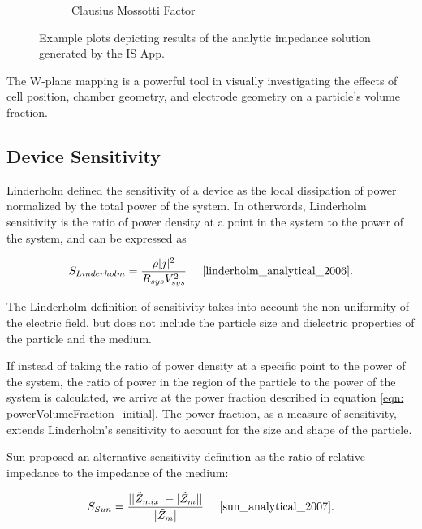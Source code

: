 \begin{figure}[h]
\begin{subfigure}[b]{0.49\textwidth}
        \caption{Clausius Mossotti Factor}
    \end{subfigure}
    \caption{Example plots depicting results of the analytic impedance solution generated by the IS App.}
    \label{fig:novel_volume_fractions_illustrations}
\end{figure}

\par The W-plane mapping is a powerful tool in visually investigating the effects of cell position, chamber geometry, and electrode geometry on a particle's volume fraction. 

\subsection{Device Sensitivity}
\par Linderholm defined the sensitivity of a device as the local dissipation of power normalized by the total power of the system. In otherwords, Linderholm sensitivity is the ratio of power density at a point in the system to the power of the system, and can be expressed as

\begin{equation}
    S_{Linderholm} = \frac{\rho |j|^2}{R_{sys}V_{sys}^2} \;\;\;\;\;\cite{linderholm_analytical_2006}.
    \label{eqn:Linderholtz}
\end{equation}

\noindent The Linderholm definition of sensitivity takes into account the non-uniformity of the electric field, but does not include the particle size and dielectric properties of the particle and the medium.

\par If instead of taking the ratio of power density at a specific point to the power of the system, the ratio of power in the region of the particle to the power of the system is calculated, we arrive at the power fraction described in equation \ref{eqn: powerVolumeFraction_initial}. The power fraction, as a measure of sensitivity, extends Linderholm's sensitivity to account for the size and shape of the particle.

\par Sun proposed an alternative sensitivity definition as the ratio of relative impedance to the impedance of the medium:

\begin{equation}
    S_{Sun} = \frac{| |\Tilde{Z}_{mix}| - |\Tilde{Z}_m| |}{|\Tilde{Z}_m|} \;\;\;\;\; \cite{sun_analytical_2007}.
    \label{eqn:Sun_sensitivity}
\end{equation}

